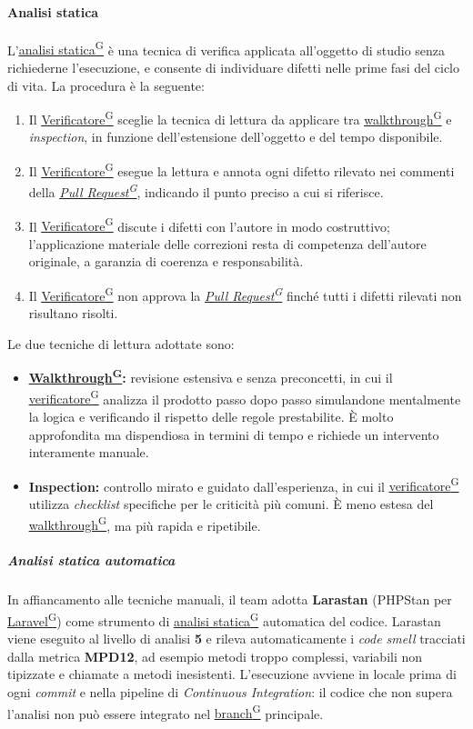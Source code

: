 \documentclass[a4paper,12pt]{article}
\providecommand{\glslink}[2]{\href{https://alittlebyte-19.github.io/Documentazione/glossario.html\#gls-#1}{\underline{#2}\textsuperscript{\scriptsize G}}}
\begin{document}
\paragraph{Analisi statica}
L'\glslink{analisi-statica}{analisi statica} è una tecnica di verifica applicata all'oggetto di studio senza richiederne l'esecuzione, e consente di individuare difetti nelle prime fasi del ciclo di vita. La procedura è la seguente:

\begin{enumerate}
    \item Il \glslink{verificatore}{Verificatore} sceglie la tecnica di lettura da applicare tra \glslink{walkthrough}{walkthrough} e \textit{inspection}, in funzione dell'estensione dell'oggetto e del tempo disponibile.
    \item Il \glslink{verificatore}{Verificatore} esegue la lettura e annota ogni difetto rilevato nei commenti della \textit{\glslink{pull-request}{Pull Request}}, indicando il punto preciso a cui si riferisce.
    \item Il \glslink{verificatore}{Verificatore} discute i difetti con l'autore in modo costruttivo; l'applicazione materiale delle correzioni resta di competenza dell'autore originale, a garanzia di coerenza e responsabilità.
    \item Il \glslink{verificatore}{Verificatore} non approva la \textit{\glslink{pull-request}{Pull Request}} finché tutti i difetti rilevati non risultano risolti.
\end{enumerate}

Le due tecniche di lettura adottate sono:
\begin{itemize}
    \item \textbf{\glslink{walkthrough}{Walkthrough}:} revisione estensiva e senza preconcetti, in cui il \glslink{verificatore}{verificatore} analizza il prodotto passo dopo passo simulandone mentalmente la logica e verificando il rispetto delle regole prestabilite. È molto approfondita ma dispendiosa in termini di tempo e richiede un intervento interamente manuale.
    \item \textbf{Inspection:} controllo mirato e guidato dall'esperienza, in cui il \glslink{verificatore}{verificatore} utilizza \textit{checklist} specifiche per le criticità più comuni. È meno estesa del \glslink{walkthrough}{walkthrough}, ma più rapida e ripetibile.
\end{itemize}

\subparagraph{Analisi statica automatica}
In affiancamento alle tecniche manuali, il team adotta \textbf{Larastan} (PHPStan per \glslink{laravel}{Laravel}) come strumento di \glslink{analisi-statica}{analisi statica} automatica del codice. Larastan viene eseguito al livello di analisi \textbf{5} e rileva automaticamente i \textit{code smell} tracciati dalla metrica \textbf{MPD12}, ad esempio metodi troppo complessi, variabili non tipizzate e chiamate a metodi inesistenti. L'esecuzione avviene in locale prima di ogni \textit{commit} e nella pipeline di \textit{Continuous Integration}: il codice che non supera l'analisi non può essere integrato nel \glslink{branch}{branch} principale.
\end{document}
